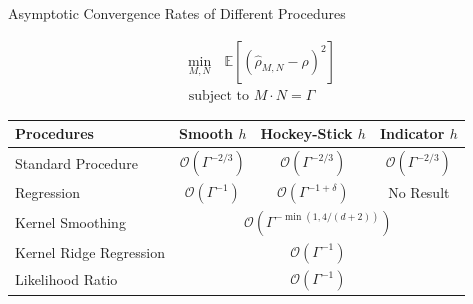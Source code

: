 \documentclass[9pt,handout]{beamer}
\begin{document}
\begin{frame}{Asymptotic Convergence Rates of Different Procedures}

    \begin{align*}
        \min_{M, N} ~~~ \mathbb{E} \left[ \left( \hat{\rho}_{M, N} - \rho \right)^2 \right] \\
        \text{ subject to } M \cdot N = \Gamma
    \end{align*}

    \vspace{10pt}

    \begin{table}
		\centering
		\begin{tabular}{l|c|c|c}
			\toprule
			\textbf{Procedures} & \textbf{Smooth $h$} & \textbf{Hockey-Stick $h$} & \textbf{Indicator $h$}  \\
			\midrule
			Standard Procedure	& \textcolor{color10_5}{$\mathcal{O}(\Gamma^{-2/3})$} & \textcolor{color10_5}{$\mathcal{O}(\Gamma^{-2/3})$} & $\mathcal{O}(\Gamma^{-2/3})$ \\
			\midrule
			Regression  & $\mathcal{O}(\Gamma^{-1})$ & $\mathcal{O}(\Gamma^{-1+\delta})$ & No Result \\
			\midrule
			Kernel Smoothing 	& \multicolumn{3}{c}{$\mathcal{O}(\Gamma^{-\min(1, 4/(d+2))})$}  \\
			\midrule
			Kernel Ridge Regression\footnotemark  		& \multicolumn{3}{c}{\textcolor{color10_3}{$\mathcal{O}(\Gamma^{-1})$}} \\
			\midrule
			Likelihood Ratio  			& \multicolumn{3}{c}{$\mathcal{O}(\Gamma^{-1})$} \\
			\bottomrule
		\end{tabular}
	\end{table}
    \vspace{10pt}



\end{frame}
\end{document}

